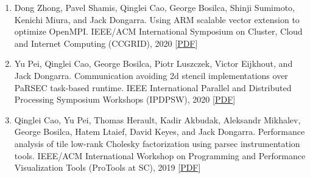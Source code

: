 \documentclass{resume} %
\let\OrigRSection\rSection
\let\OrigEndRSection\endrSection
\let\OrigMakeUppercase\MakeUppercase
\renewenvironment{rSection}[1]{
    \renewcommand{\MakeUppercase}[1]{\textcolor{blue}{\OrigMakeUppercase{##1}}}%
    \OrigRSection{#1}%
}{%
    \OrigEndRSection%
}
\begin{document}
\begin{rSection}{\faBook~Publications}
\begin{itemize}
\begin{enumerate}[leftmargin=8pt, align=left]
    \item Dong Zhong, Pavel Shamis, {Qinglei Cao}, George Bosilca, Shinji Sumimoto, Kenichi Miura, and Jack Dongarra. Using ARM scalable vector extension to optimize OpenMPI. IEEE/ACM International Symposium on Cluster, Cloud and Internet Computing ({CCGRID}), 2020 \hfill[\href{https://qingleicao.com/papers/Using_Arm_Scalable_Vector_Extension_to_Optimize_OPEN_MPI.pdf}{PDF}]
    \item Yu Pei, {Qinglei Cao}, George Bosilca, Piotr Luszczek, Victor Eijkhout, and Jack Dongarra. Communication avoiding 2d stencil implementations over PaRSEC task-based runtime. IEEE International Parallel and Distributed Processing Symposium Workshops (IPDPSW), 2020 \hfill[\href{https://qingleicao.com/papers/Communication_Avoiding_2D_Stencil_Implementations_over_PaRSEC_Task-Based_Runtime.pdf}{PDF}]
    \item {Qinglei Cao}, Yu Pei, Thomas Herault, Kadir Akbudak, Aleksandr Mikhalev, George Bosilca, Hatem Ltaief, David Keyes, and Jack Dongarra. Performance analysis of tile low-rank Cholesky factorization using parsec instrumentation tools. IEEE/ACM International Workshop on Programming and Performance Visualization Tools (ProTools at SC), 2019 \hfill[\href{https://qingleicao.com/papers/Performance Analysis of Tile Low-Rank Cholesky Factorization Using PaRSEC Instrumentation Tools.pdf}{PDF}]
  \end{enumerate}


\end{itemize}
\end{rSection}
\end{document}
